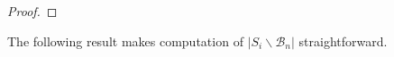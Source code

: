 \documentclass[12pt]{amsart}
\numberwithin{equation}{section}
\theoremstyle{remark}
\theoremstyle{definition}
\newcommand{\B}{\mathcal{B}}
\begin{document}
\begin{proof}
\end{proof}



The following result makes computation of $|S_i\backslash\B_{n}|$ straightforward.
\end{document}
